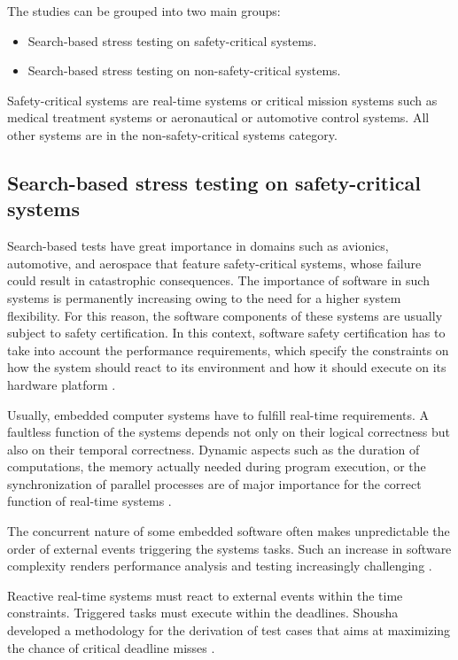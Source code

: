 \documentclass{bmcart}
\begin{document}
The studies can be grouped into two main groups:

\begin{itemize}
\item Search-based stress testing on safety-critical systems.
\item Search-based stress testing on non-safety-critical systems.
\end{itemize}

Safety-critical systems are real-time systems or critical mission systems such as medical treatment systems or aeronautical or automotive control systems. All other systems are in the non-safety-critical systems category.

\subsection{Search-based stress testing on safety-critical systems}

Search-based tests have great importance in domains such as avionics, automotive, and aerospace that feature safety-critical systems, whose failure could result in catastrophic consequences.  The importance
of software in such systems is permanently increasing owing to the need for a higher system
flexibility. For this reason, the software components of these systems are usually subject to safety certification. In this context, software safety certification has to take into account the performance requirements, which specify the constraints on how the system should react to its environment and how it should execute on its hardware platform \citep{DiAlesio2013}.

Usually, embedded computer systems have to fulfill real-time requirements. A faultless function of the systems depends not only on their logical correctness but also on their temporal correctness. Dynamic aspects such as the duration of computations, the memory actually needed during program execution, or the synchronization of parallel processes are of major importance for the correct function of real-time systems  \citep{J.WegenerK.GrimmM.GrochtmannH.Sthamer1996} .

The concurrent nature of some embedded software often makes unpredictable the order of external events triggering the systems tasks. Such an increase in software complexity renders performance analysis and testing increasingly challenging \citep{DiAlesio2013}.

Reactive real-time systems must react to external events within the time constraints. Triggered tasks must execute within the deadlines. Shousha developed a methodology for the derivation of test cases that aims at maximizing the chance of critical deadline misses \citep{shousha2003performance}. 
\end{document}
